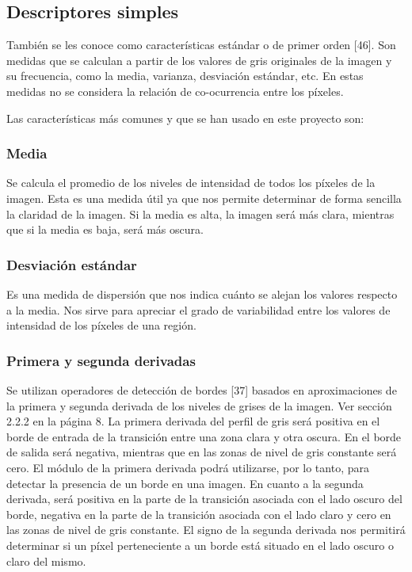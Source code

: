 \subsection{Descriptores simples}
También se les conoce como características estándar o de primer orden [46]. Son medidas que
se calculan a partir de los valores de gris originales de la imagen y su frecuencia, como la media, varianza, desviación estándar, etc. En estas medidas no se considera la relación de co-ocurrencia entre los píxeles.

Las características más comunes y que se han usado en este proyecto son:

\subsubsection*{Media}
Se calcula el promedio de los niveles de intensidad de todos los píxeles de la imagen. Esta es una medida útil ya que nos permite determinar de forma sencilla la claridad de la imagen. Si la media es alta, la imagen será más clara, mientras que si la media es baja, será más oscura.

\subsubsection*{Desviación estándar}
Es una medida de dispersión que nos indica cuánto se alejan los valores respecto a la media. Nos sirve para apreciar el grado de variabilidad entre los valores de intensidad de los píxeles de una región.

\subsubsection*{Primera y segunda derivadas}
Se utilizan operadores de detección de bordes [37] basados en aproximaciones de la primera y segunda derivada de los niveles de grises de la imagen. Ver sección 2.2.2 en la página 8. La primera derivada del perfil de gris será positiva en el borde de entrada de la transición entre una zona clara y otra oscura. En el borde de salida será negativa, mientras que en las zonas de nivel de gris constante será cero. El módulo de la primera derivada podrá utilizarse, por lo tanto, para detectar la presencia de un borde en una imagen. En cuanto a la segunda derivada, será positiva en la parte de la transición asociada con el lado oscuro del borde, negativa en la parte de la transición asociada con el lado claro y cero en las zonas de nivel de gris constante. El signo de la segunda derivada nos permitirá determinar si un píxel perteneciente a un borde está situado en el lado oscuro o claro del mismo.



